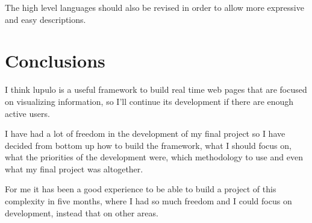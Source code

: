 \documentclass[12pt]{article}
\begin{document}
        The high level languages should also be revised in order to allow more
        expressive and easy descriptions.

    \section{Conclusions}
        I think lupulo is a useful framework to build real time web pages that
        are focused on visualizing information, so I'll continue its development
        if there are enough active users.

        I have had a lot of freedom in the development of my final project so I
        have decided from bottom up how to build the framework, what I should
        focus on, what the priorities of the development were, which
        methodology to use and even what my final project was altogether.

        For me it has been a good experience to be able to build a project of
        this complexity in five months, where I had so much freedom and I could
        focus on development, instead that on other areas.
\end{document}
